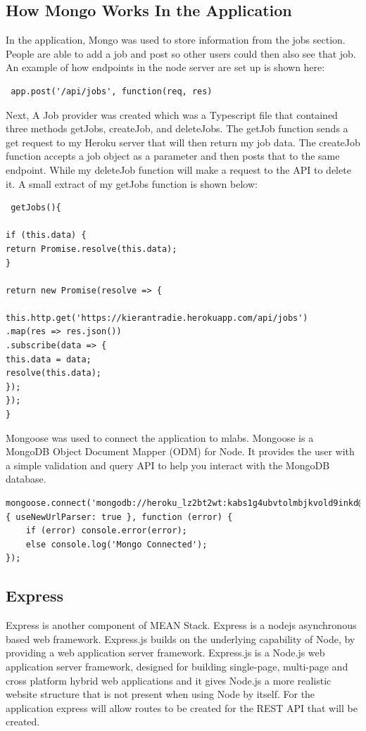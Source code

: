 \subsection{How Mongo Works In the Application}
In the application, Mongo was used to store information from the jobs section. People are able to add a job and post so other users could then also see that job. An example of how endpoints in the node server are set up is shown here:

\begin{verbatim}
 app.post('/api/jobs', function(req, res)
\end{verbatim}

Next, A Job provider was created which was a Typescript file that contained three methods getJobs, createJob, and deleteJobs. The getJob function sends a get request to my Heroku server that will then return my job data. The createJob function accepts a job object as a parameter and then posts that to the same endpoint. While my deleteJob function will make a request to the API to delete it. A small extract of my getJobs function is shown below:

\begin{verbatim}
 getJobs(){

if (this.data) {
return Promise.resolve(this.data);
}

return new Promise(resolve => {

this.http.get('https://kierantradie.herokuapp.com/api/jobs')
.map(res => res.json())
.subscribe(data => {
this.data = data;
resolve(this.data);
});
});
}
\end{verbatim}

Mongoose was used to connect the application to mlabs. Mongoose is a MongoDB Object Document Mapper (ODM) for Node. It provides the user with a simple validation and query API to help you interact with the MongoDB database.

\begin{verbatim}
mongoose.connect('mongodb://heroku_lz2bt2wt:kabs1g4ubvtolmbjkvold9inkd@ds227185.mlab.com:27185/heroku_lz2bt2wt',{ useNewUrlParser: true }, function (error) {
    if (error) console.error(error);
    else console.log('Mongo Connected');
});
\end{verbatim}


\subsection{Express}
Express is another component of MEAN Stack. Express is a nodejs asynchronous based web framework. Express.js builds on the underlying capability of Node, by providing a web application server framework. Express.js is a Node.js web application server framework, designed for building single-page, multi-page and cross platform hybrid web applications and it gives Node.js a more realistic website structure that is not present when using Node by itself. For the application express will allow routes to be created for the REST API that will be created.\cite{expressjs}
